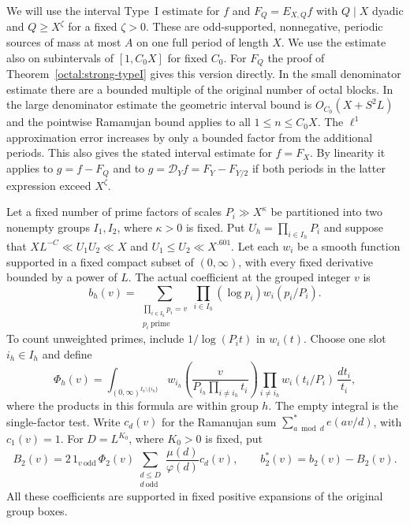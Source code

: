 \documentclass[11pt,a4paper]{article}
\theoremstyle{paperplain}
\numberwithin{equation}{section}
\begin{document}
We will use the interval Type~I estimate for $f$ and
$F_Q=E_{X,Q}f$ with $Q\mid X$ dyadic and $Q\ge X^\zeta$ for a fixed
$\zeta>0$. These are odd-supported, nonnegative, periodic sources of
mass at most $A$ on one full period of length $X$. We use the estimate
also on subintervals of $[1,C_0X]$ for fixed $C_0$. For $F_Q$ the proof
of Theorem~\ref{octal:strong-typeI} gives this version
directly. In the small denominator estimate there are a bounded
multiple of the original number of octal blocks. In the large
denominator estimate the geometric interval bound is
$O_{C_0}(X+S^2L)$ and the pointwise Ramanujan bound applies to all
$1\le n\le C_0X$. The $\ell^1$ approximation error increases by only
a bounded factor from the additional periods. This also gives the
stated interval estimate for $f=F_X$. By linearity it applies to
$g=f-F_Q$ and to $g=\mathcal D_Yf=F_Y-F_{Y/2}$ if both periods in
the latter expression exceed $X^\zeta$.

Let a fixed number of prime factors of scales $P_i\gg X^\kappa$ be
partitioned into two nonempty groups $I_1,I_2$, where $\kappa>0$ is
fixed. Put $U_h=\prod_{i\in I_h}P_i$ and suppose that
$X L^{-C}\ll U_1U_2\ll X$ and $U_1\le U_2\ll X^{.601}$. Let each $w_i$ be
a smooth function supported in a fixed compact subset of $(0,\infty)$,
with every fixed derivative bounded by a power of $L$. The actual
coefficient at the grouped integer $v$ is
\[
 b_h(v)=\sum_{\substack{\prod_{i\in I_h}p_i=v\\ p_i\ \mathrm{prime}}}
                 \prod_{i\in I_h}(\log p_i)w_i(p_i/P_i).
\]
To count unweighted primes, include $1/\log(P_i t)$ in $w_i(t)$.
Choose one slot $i_h\in I_h$ and define
\[
 \Phi_h(v)=\int_{(0,\infty)^{I_h\setminus\{i_h\}}}
   w_{i_h}\left(\frac{v}{P_{i_h}\prod_{i\ne i_h}t_i}\right)
   \prod_{i\ne i_h}w_i(t_i/P_i)\,\frac{dt_i}{t_i},
\]
where the products in this formula are within group $h$. The empty
integral is the single-factor test. Write $c_d(v)$ for the Ramanujan
sum $\sum_{a\bmod d}^{*}e(av/d)$, with $c_1(v)=1$. For $D=L^{K_0}$,
where $K_0>0$ is fixed, put
\begin{equation}\label{eq:principal-grouped-coefficients}
 B_2(v)=2\,1_{v\ \mathrm{odd}}\,\Phi_2(v)
       \sum_{\substack{d\le D\\ d\ \mathrm{odd}}}
                   \frac{\mu(d)}{\varphi(d)}c_d(v),
 \qquad b_2^*(v)=b_2(v)-B_2(v).
\end{equation}
All these coefficients are supported in fixed positive expansions
of the original group boxes.
\end{document}
